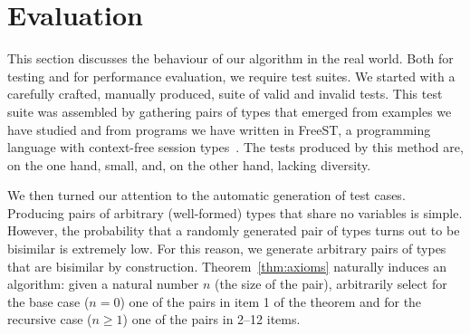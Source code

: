 \section{Evaluation}
\label{sec:evaluation}

This section discusses the behaviour of our algorithm in the real
world.
%
Both for testing and for performance evaluation, we require test
suites. We started with a carefully crafted, manually produced, suite
of valid and invalid tests. This test suite was assembled by
gathering pairs of types that emerged from examples we have studied
and from programs we have written in FreeST, a programming language
with context-free session
types~\cite{almeida.etal_freest-functional-language}.
The tests produced by this method are, on the one hand, small, and, on
the other hand, lacking diversity.

We then turned our attention to the automatic generation of test
cases. Producing pairs of arbitrary (well-formed) types that share no
variables is simple.  However, the probability that a randomly
generated pair of types turns out to be bisimilar is extremely
low. For this reason, we generate arbitrary pairs of types that are
bisimilar by construction. Theorem~\ref{thm:axioms} naturally induces
an algorithm: given a natural number $n$ (the size of the pair),
arbitrarily select for the base case ($n=0$) one of the pairs in item
1 of the theorem and for the recursive case ($n\ge1$) one of the pairs
in 2--12 items.

